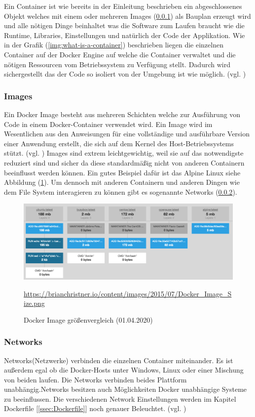 Ein Container ist wie bereits in der Einleitung beschrieben ein abgeschlossenes Objekt welches mit einem oder mehreren Images (\ref{ssec:DockerImages}) als Bauplan erzeugt wird und alle nötigen Dinge beinhaltet was die Software zum Laufen braucht wie die Runtime, Libraries, Einstellungen und natürlich der Code der Applikation. Wie in der Grafik (\ref {img:what-is-a-container}) beschrieben liegen die einzelnen Container auf der Docker Engine auf welche die Container verwaltet und die nötigen Ressourcen vom Betriebssystem zu Verfügung stellt. Dadurch wird sichergestellt das der Code so isoliert von der Umgebung ist wie möglich. (vgl. \cite{DockerContainer})
\subsubsection{Images} \label{ssec:DockerImages}
Ein Docker Image besteht aus mehreren Schichten welche zur Ausführung von Code in einem Docker-Container verwendet wird. Ein Image wird im Wesentlichen aus den Anweisungen für eine vollständige und ausführbare Version einer Anwendung erstellt, die sich auf dem Kernel des Host-Betriebssystems stützt. (vgl. \cite{DockerImage})
Images sind extrem leichtgewichtig, weil sie auf das notwendigste reduziert sind und sicher da diese standardmäßig nicht von anderen Containern beeinflusst werden können. Ein gutes Beispiel dafür ist das Alpine Linux siehe Abbildung (\ref{img:docker-image-size}). Um dennoch mit anderen Containern und anderen Dingen wie dem File System interagieren zu können gibt es sogenannte Networks (\ref{ssec:DockerNetworks}).
\begin{figure}[H]
    \includegraphics[scale=.40]{images/Docker_Image_Size.png}
    \caption{Docker Image größenvergleich (01.04.2020)}
    \url{https://brianchristner.io/content/images/2015/07/Docker_Image_Size.png}
    \label{img:docker-image-size}
\end{figure}
\subsubsection{Networks} \label{ssec:DockerNetworks}
Networks(Netzwerke) verbinden die einzelnen Container miteinander. Es ist außerdem egal ob die Docker-Hosts unter Windows, Linux oder einer Mischung von beiden laufen. Die Networks verbinden beides Plattform unabhängig.Networks besitzen auch Möglichkeiten Docker unabhängige Systeme zu beeinflussen. Die verschiedenen Network Einstellungen werden im Kapitel Dockerfile [\ref{ssec:Dockerfile}] noch genauer Beleuchtet. (vgl. \cite{DockerNetworks})
